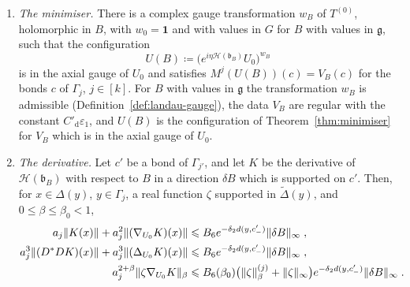 \documentclass[11pt]{preprint}
\newcommand{\id}{\mathbf 1}
\DeclarePairedDelimiter{\norm}{\lVert}{\rVert}
\numberwithin{equation}{section}
\begin{document}
\begin{theorem}
\begin{enumerate}[label=(\roman*)]
\begin{equation}
\begin{gathered}
    \norm{\mathcal H(\mathfrak b_B)}_{\infty,*} + \norm{D^*D\mathcal H(\mathfrak b_B)}_{\infty,(-3)} + \norm{\Delta_{U_0}\mathcal H(\mathfrak b_B)}_{\infty,(-3)} \leqslant B_6\norm B_\infty\;,\\
    RD^*\mathcal H(\mathfrak b_B) = 0\;.
\end{gathered}
\end{equation}
\item \emph{The minimiser.} There is a complex gauge transformation $w_B$ of $T^{(0)}$, holomorphic in $B$, with $w_0 = \id$ and with values in $G$ for $B$ with values in $\mathfrak g$, such that the configuration
\begin{equation}\label{eq:moved-minimiser}
    U(B) \coloneqq \bigl(e^{i\eta\mathcal H(\mathfrak b_B)}U_0\bigr)^{w_B}
\end{equation}
is in the axial gauge of $U_0$ and satisfies $M^j(U(B))(c) = V_B(c)$ for the bonds $c$ of $\Gamma_j$, $j \in [k]$. For $B$ with values in $\mathfrak g$ the transformation $w_B$ is admissible (Definition~\ref{def:landau-gauge}), the data $V_B$ are regular with the constant $C'_{\mathrm d}\varepsilon_1$, and $U(B)$ is the configuration of Theorem~\ref{thm:minimiser} for $V_B$ which is in the axial gauge of $U_0$.
\item \emph{The derivative.} Let $c'$ be a bond of $\Gamma_{j'}$, and let $K$ be the derivative of $\mathcal H(\mathfrak b_B)$ with respect to $B$ in a direction $\delta B$ which is supported on $c'$. Then, for $x \in \Delta(y)$, $y \in \Gamma_j$, a real function $\zeta$ supported in $\tilde\Delta(y)$, and $0 \leqslant \beta \leqslant \beta_0 < 1$,
\begin{equation}\label{eq:background-derivative}
\begin{aligned}
    a_j\norm{K(x)} + a_j^2\norm{(\nabla_{U_0}K)(x)} &\leqslant B_6e^{-\delta_2d(y, c'_-)}\norm{\delta B}_\infty\;,\\
    a_j^3\norm{(D^*DK)(x)} + a_j^3\norm{(\Delta_{U_0}K)(x)} &\leqslant B_6e^{-\delta_2d(y, c'_-)}\norm{\delta B}_\infty\;,\\
    a_j^{2+\beta}\norm{\zeta\nabla_{U_0}K}_\beta &\leqslant B_6(\beta_0)\bigl(\norm\zeta_\beta^{(j)} + \norm\zeta_\infty\bigr)e^{-\delta_2d(y, c'_-)}\norm{\delta B}_\infty\;.
\end{aligned}
\end{equation}
\end{enumerate}
\end{theorem}
\end{document}
